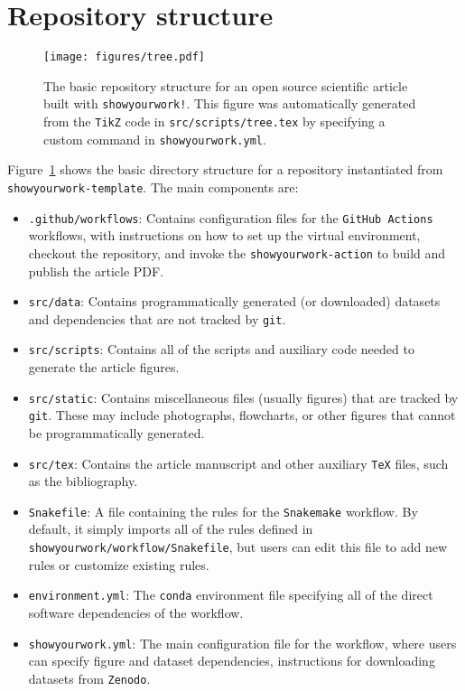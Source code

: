 \documentclass[modern]{aastex631}
\begin{document}
\section{Repository structure}
\label{sec:struct}
%
\begin{figure}[ht!]
    \begin{centering}
        \texttt{[image: figures/tree.pdf]}
        \caption{
            The basic repository structure for an open source scientific article built with \texttt{showyourwork!}.
            This figure was automatically generated from the \texttt{TikZ} code in \texttt{src/scripts/tree.tex} by specifying a custom command in \texttt{showyourwork.yml}.
        }
        \label{fig:tree}
    \end{centering}
\end{figure}
%
Figure~\ref{fig:tree} shows the basic directory structure for a repository instantiated from \texttt{showyourwork-template}. 
The main components are:
\begin{itemize}
    \item \texttt{.github/workflows}: Contains configuration files for the \texttt{GitHub Actions} workflows, with instructions on how to set up the virtual environment, checkout the repository, and invoke the \texttt{showyourwork-action} to build and publish the article PDF.
    \item \texttt{src/data}: Contains programmatically generated (or downloaded) datasets and dependencies that are not tracked by \texttt{git}.
    \item \texttt{src/scripts}: Contains all of the scripts and auxiliary code needed to generate the article figures.
    \item \texttt{src/static}: Contains miscellaneous files (usually figures) that are tracked by \texttt{git}.
    These may include photographs, flowcharts, or other figures that cannot be programmatically generated.
    \item \texttt{src/tex}: Contains the article manuscript and other auxiliary \texttt{TeX} files, such as the bibliography.
    \item \texttt{Snakefile}: A file containing the rules for the \texttt{Snakemake} workflow.
    By default, it simply imports all of the rules defined in \texttt{showyourwork/workflow/Snakefile}, but users can edit this file to add new rules or customize existing rules.
    \item \texttt{environment.yml}: The \texttt{conda} environment file specifying all of the direct software dependencies of the workflow.
    \item \texttt{showyourwork.yml}: The main configuration file for the workflow, where users can specify figure and dataset dependencies, instructions for downloading datasets from \texttt{Zenodo}.
\end{itemize}
\end{document}
